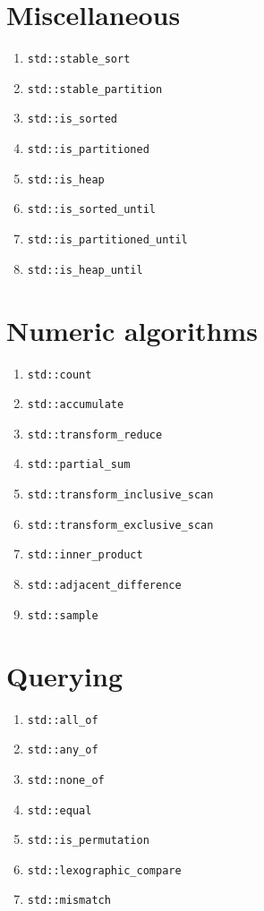 \documentclass{article}
\begin{document}
\begin{multicols}{3}
\section{Miscellaneous}
\begin{enumerate}[resume]
\setlength\itemsep{0em}
\item \texttt{std::stable\_sort}
\item \texttt{std::stable\_partition}
\item \texttt{std::is\_sorted}
\item \texttt{std::is\_partitioned}
\item \texttt{std::is\_heap}
\item \texttt{std::is\_sorted\_until}
\item \texttt{std::is\_partitioned\_until}
\item \texttt{std::is\_heap\_until}
\end{enumerate}

\section{Numeric algorithms}
\begin{enumerate}[resume]
\setlength\itemsep{0em}
\item \texttt{std::count}
\item \texttt{std::accumulate}
\item \texttt{std::transform\_reduce}
\item \texttt{std::partial\_sum}
\item \texttt{std::transform\_inclusive\_scan}
\item \texttt{std::transform\_exclusive\_scan}
\item \texttt{std::inner\_product}
\item \texttt{std::adjacent\_difference}
\item \texttt{std::sample}
\end{enumerate}

\section{Querying}
\begin{enumerate}[resume]
\setlength\itemsep{0em}
\item \texttt{std::all\_of}
\item \texttt{std::any\_of}
\item \texttt{std::none\_of}
\item \texttt{std::equal}
\item \texttt{std::is\_permutation}
\item \texttt{std::lexographic\_compare}
\item \texttt{std::mismatch}
\end{enumerate}


\end{multicols}
\end{document}
